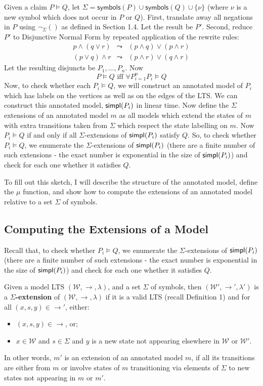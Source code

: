 Given a claim $P \models Q$, let $\Sigma = \mathsf{symbols}(P) \cup \mathsf{symbols}(Q) \cup \{\nu\}$ (where $\nu$ is a new symbol which does not occur in $P$ or $Q$).
First, translate away all negations in $P$ using $\neg_\Sigma()$ as defined in Section 1.4.
Let the result be $P'$.
Second, reduce $P'$ to Disjunctive Normal Form by repeated application of the rewrite rules:
\begin{eqnarray*}
p \land (q \lor r) & \leadsto & (p \land q) \lor (p \land r)  \\
(p \lor q) \land r & \leadsto & (p \land r) \lor (q \land r) 
\end{eqnarray*}
Let the resulting disjuncts be $P_1, ..., P_n$. 
Now 
\[
P \models Q \mbox{ iff } \forall P_{i=1}^n P_i \models Q
\]
Now, to check whether each $P_i \models Q$, we will construct an annotated model of $P_i$ which has labels on the vertices as well as on the edges of the LTS. We can construct this annotated model, $\mathsf{simpl}(P_i)$ in linear time. 
Now define the $\Sigma$ extensions of an annotated model $m$ as all models which extend the states of $m$ with extra transitions taken from $\Sigma$ which respect the state labelling on $m$.
Now $P_i \models Q$ if and only if all $\Sigma$-extensions of $\mathsf{simpl}(P_i)$ satisfy $Q$.
So, to check whether $P_i \models Q$, we enumerate the $\Sigma$-extensions of $\mathsf{simpl}(P_i)$ (there are a finite number of such extensions - the exact number is exponential in the size of $\mathsf{simpl}(P_i)$) and check for each one whether it satisfies $Q$.

To fill out this sketch, I will describe the structure of the annotated model, define the $\mu$ function, and show how to compute the extensions of an annotated model relative to a set $\Sigma$ of symbols.


\subsection{Computing the Extensions of a Model}

Recall that, to check whether $P_i \models Q$, we enumerate the $\Sigma$-extensions of $\mathsf{simpl}(P_i)$ (there are a finite number of such extensions - the exact number is exponential in the size of $\mathsf{simpl}(P_i)$) and check for each one whether it satisfies $Q$.

\begin{definition}
Given a model LTS $(\mathcal{W},\rightarrow,\lambda)$,  and a set $\Sigma$ of symbols, then $(\mathcal{W'},\rightarrow',\lambda')$ is a {\bf $\Sigma$-extension} of $(\mathcal{W},\rightarrow,\lambda)$ if it is a valid LTS (recall Definition 1) and for all $(x,s,y) \in \rightarrow'$, either:
\begin{itemize} 
\item
$(x, s, y) \in \rightarrow$,  or;
\item
 $x \in \mathcal{W}$ and $s \in \Sigma$ and $y$ is a new state not appearing elsewhere in $\mathcal{W}$ or $\mathcal{W'}$.
\end{itemize}
\end{definition}
In other words, $m'$ is an extension of an annotated model $m$, if all its transitions are either from $m$ or involve states of $m$ transitioning via elements of $\Sigma$ to new states not appearing in $m$ or $m'$.

